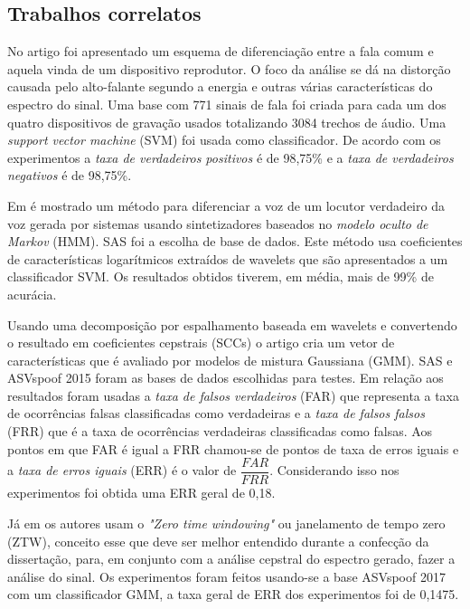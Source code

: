 \begin{myenv}{1.5}
	\section{Trabalhos correlatos}
		\par No artigo \cite{Ren2019} foi apresentado um esquema de diferenciação entre a fala comum e aquela vinda de um dispositivo reprodutor. O foco da análise se dá na distorção causada pelo alto-falante segundo a energia e outras várias características do espectro do sinal. Uma base com 771 sinais de fala foi criada para cada um dos quatro dispositivos de gravação usados totalizando 3084 trechos de áudio. Uma \textit{support vector machine} (SVM) foi usada como classificador. De  acordo com os experimentos a \textit{taxa de verdadeiros positivos} é de 98,75\% e a \textit{taxa de verdadeiros negativos} é de 98,75\%.
		
		\par Em \cite{DiqunYan2019} é mostrado um método para diferenciar a voz de um locutor verdadeiro da voz gerada por sistemas usando sintetizadores baseados no \textit{modelo oculto de Markov} (HMM). SAS\cite{SAS2019} foi a escolha de base de dados. Este método usa coeficientes de características logarítmicos extraídos de wavelets que são apresentados a um classificador SVM. Os resultados obtidos tiverem, em média, mais de 99\% de acurácia.
		
		\par Usando uma decomposição por espalhamento baseada em wavelets e convertendo o resultado em coeficientes cepstrais (SCCs) o artigo \cite{7802552} cria um vetor de características que é avaliado por modelos de mistura Gaussiana (GMM). SAS e ASVspoof 2015 \cite{ASVspoof2015} foram as bases de dados escolhidas para testes. Em relação aos resultados foram usadas a \textit{taxa de falsos verdadeiros} (FAR) que representa a taxa de ocorrências falsas classificadas como verdadeiras e a \textit{taxa de falsos falsos} (FRR) que é a taxa de ocorrências verdadeiras classificadas como falsas. Aos pontos em que FAR é igual a FRR chamou-se de pontos de taxa de erros iguais e a \textit{taxa de erros iguais} (ERR) é o valor de $\dfrac{FAR}{FRR}$. Considerando isso nos experimentos foi obtida uma ERR geral de 0,18.

		\par Já em \cite{alluri2019replay} os autores usam o \textit{"Zero time windowing"} ou janelamento de tempo zero (ZTW), conceito esse que deve ser melhor entendido durante a confecção da dissertação, para, em conjunto com a análise cepstral do espectro gerado, fazer a análise do sinal. Os experimentos foram feitos usando-se a base ASVspoof 2017\cite{ASVspoof2017} com um classificador GMM, a taxa geral de ERR dos experimentos foi de 0,1475.
		

\end{myenv}
